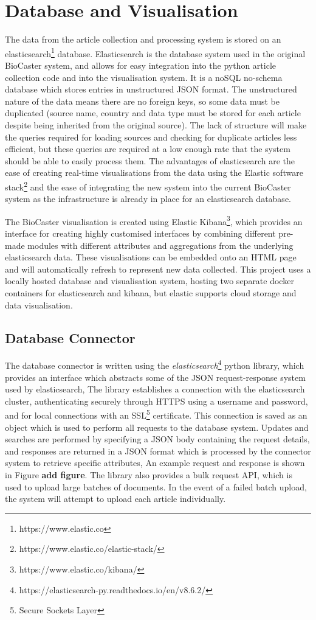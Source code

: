 \documentclass{l4proj}
\begin{document}
\section{Database and Visualisation}
The data from the article collection and processing system is stored on an elasticsearch\footnote{https://www.elastic.co} database. Elasticsearch is the database system used in the original BioCaster system, and allows for easy integration into the python article collection code and into the visualisation system. It is a noSQL no-schema database which stores entries in unstructured JSON format. The unstructured nature of the data means there are no foreign keys, so some data must be duplicated (source name, country and data type must be stored for each article despite being inherited from the original source). The lack of structure will make the queries required for loading sources and checking for duplicate articles less efficient, but these queries are required at a low enough rate that the system should be able to easily process them. The advantages of elasticsearch are the ease of creating real-time visualisations from the data using the Elastic software stack\footnote{https://www.elastic.co/elastic-stack/} and the ease of integrating the new system into the current BioCaster system as the infrastructure is already in place for an elasticsearch database.\par
The BioCaster visualisation is created using Elastic Kibana\footnote{https://www.elastic.co/kibana/}, which provides an interface for creating highly customised interfaces by combining different pre-made modules with different attributes and aggregations from the underlying elasticsearch data. These visualisations can be embedded onto an HTML page and will automatically refresh to represent new data collected. This project uses a locally hosted database and visualisation system, hosting two separate docker containers for elasticsearch and kibana, but elastic supports cloud storage and data visualisation. 

\subsection{Database Connector}
The database connector is written using the \emph{elasticsearch}\footnote{https://elasticsearch-py.readthedocs.io/en/v8.6.2/} python library, which provides an interface which abstracts some of the JSON request-response system used by elasticsearch, The library establishes a connection with the elasticsearch cluster, authenticating securely through HTTPS using a username and password, and for local connections with an SSL\footnote{Secure Sockets Layer} certificate. This connection is saved as an object which is used to perform all requests to the database system. Updates and searches are performed by specifying a JSON body containing the request details, and responses are returned in a JSON format which is processed by the connector system to retrieve specific attributes, An example request and response is shown in Figure \textbf{add figure}. The library also provides a bulk request API, which is used to upload large batches of documents. In the event of a failed batch upload, the system will attempt to upload each article individually.
\end{document}
